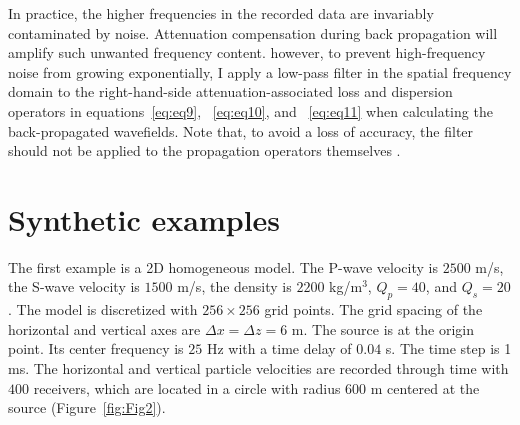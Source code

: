 In practice, the higher frequencies in the recorded data are invariably contaminated by noise. Attenuation compensation during back propagation will amplify such unwanted frequency content. however, to prevent high-frequency noise from growing exponentially, I apply a low-pass filter in the spatial frequency domain to the right-hand-side attenuation-associated loss and dispersion operators in equations~\ref{eq:eq9}, ~\ref{eq:eq10}, and ~\ref{eq:eq11} when calculating the back-propagated wavefields. Note that, to avoid a loss of accuracy, the filter should not be applied to the propagation operators themselves \cite[]{zhu15a}. 

\section{Synthetic examples}
The first example is a 2D homogeneous model. The P-wave velocity is $2500$ m/s, the S-wave velocity is $1500$ m/s, the density is $2200$ kg/m$^3$, $Q_p=40$, and $Q_s=20$. The model is discretized with $256\times 256$ grid points. The grid spacing of the horizontal and vertical axes are $\Delta x=\Delta z=6$ m. The source is at the origin point. Its center frequency is $25$ Hz with a time delay of $0.04$ s. The time step is 1 ms. The horizontal and vertical particle velocities are recorded through time with $400$ receivers, which are located in a circle with radius $600$ m centered at the source (Figure~\ref{fig:Fig2}).


